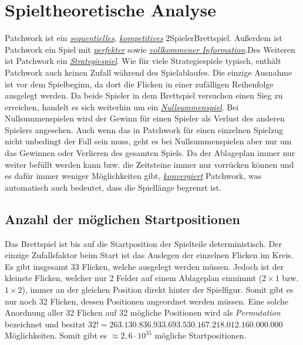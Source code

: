 \section{Spieltheoretische Analyse}
\label{section:spieltheoretische-analyse}

Patchwork ist ein \hyperref[text:game-theory-sequenziell]{\emph{sequentielles}}, \hyperref[text:game-theory-kompetitiv]{\emph{kompetitives}} 2\textendash{}Spieler\textendash{}Brettspiel. Außerdem ist Patchwork ein Spiel mit \hyperref[text:game-theory-perfekte-information]{\emph{perfekter}} sowie \hyperref[text:game-theory-vollkommene-information]{\emph{vollkommener Information}}.Des Weiteren ist Patchwork ein \hyperref[text:game-theory-strategiespiel]{\emph{Strategiespiel}}. Wie für viele Strategiespiele typisch, enthält Patchwork auch keinen Zufall während des Spielablaufes. Die einzige Ausnahme ist vor dem Spielbeginn, da dort die Flicken in einer zufälligen Reihenfolge ausgelegt werden. Da beide Spieler in dem Brettspiel versuchen einen Sieg zu erreichen, handelt es sich weiterhin um ein \hyperref[text:game-theory-nullsummenspiel]{\emph{Nullsummenspiel}}. Bei Nullsummenspielen wird der Gewinn für einen Spieler als Verlust des anderen Spielers angesehen. Auch wenn das in Patchwork für einen einzelnen Spielzug nicht unbedingt der Fall sein muss, geht es bei Nullsummenspielen aber nur um das Gewinnen oder Verlieren des gesamten Spiels. Da der Ablageplan immer nur weiter befüllt werden kann bzw. die Zeitsteine immer nur vorrücken können und es dafür immer weniger Möglichkeiten gibt, \hyperref[text:game-theory-konvergenz]{\emph{konvergiert}} Patchwork, was automatisch auch bedeutet, dass die Spiellänge begrenzt ist.

\subsection*{Anzahl der möglichen Startpositionen}

Das Brettspiel ist bis auf die Startposition der Spielteile deterministisch. Der einzige Zufallsfaktor beim Start ist das Auslegen der einzelnen Flicken im Kreis. Es gibt insgesamt 33 Flicken, welche ausgelegt werden müssen. Jedoch ist der kleinste Flicken, welcher nur 2 Felder auf einem Ablageplan einnimmt ($2\times1$ bzw. $1\times2$), immer an der gleichen Position direkt hinter der Spielfigur. Somit gibt es nur noch 32 Flicken, dessen Positionen angeordnet werden müssen. Eine solche Anordnung aller 32 Flicken auf 32 mögliche Positionen wird als \emph{Permutation} bezeichnet und besitzt $32! = 263.130.836.933.693.530.167.218.012.160.000.000$ Möglichkeiten. Somit gibt es $\approx 2{,}6 \cdot 10^{35}$ mögliche Startpositionen.

